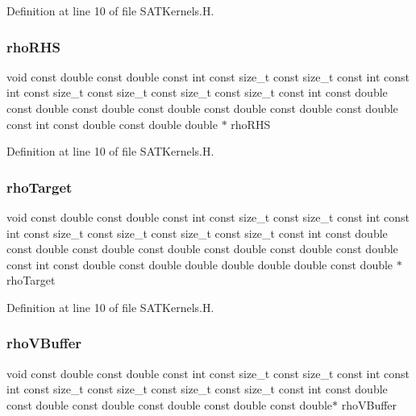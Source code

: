 Definition at line 10 of file S\+A\+T\+Kernels.\+H.

\hypertarget{SATKernels_8H_a57216e7c305dcf4eb48881fb0d4a5d78}{}\label{SATKernels_8H_a57216e7c305dcf4eb48881fb0d4a5d78} 
\subsubsection{\texorpdfstring{rho\+R\+HS}{rhoRHS}}
{\footnotesize\ttfamily void const double const double const int const size\+\_\+t const size\+\_\+t const int const int const size\+\_\+t const size\+\_\+t const size\+\_\+t const size\+\_\+t const int const double const double const double const double const double const double const double const int const double const double double $\ast$ rho\+R\+HS}



Definition at line 10 of file S\+A\+T\+Kernels.\+H.

\hypertarget{SATKernels_8H_a3499ab88b8b2ace36d84356b19632298}{}\label{SATKernels_8H_a3499ab88b8b2ace36d84356b19632298} 
\subsubsection{\texorpdfstring{rho\+Target}{rhoTarget}}
{\footnotesize\ttfamily void const double const double const int const size\+\_\+t const size\+\_\+t const int const int const size\+\_\+t const size\+\_\+t const size\+\_\+t const size\+\_\+t const int const double const double const double const double const double const double const double const int const double const double double double double double const double $\ast$ rho\+Target}



Definition at line 10 of file S\+A\+T\+Kernels.\+H.

\hypertarget{SATKernels_8H_a77e93407ab66bf5f0aa4f6d87b62ec81}{}\label{SATKernels_8H_a77e93407ab66bf5f0aa4f6d87b62ec81} 
\subsubsection{\texorpdfstring{rho\+V\+Buffer}{rhoVBuffer}}
{\footnotesize\ttfamily void const double const double const int const size\+\_\+t const size\+\_\+t const int const int const size\+\_\+t const size\+\_\+t const size\+\_\+t const size\+\_\+t const int const double const double const double const double const double const double$\ast$ rho\+V\+Buffer}



